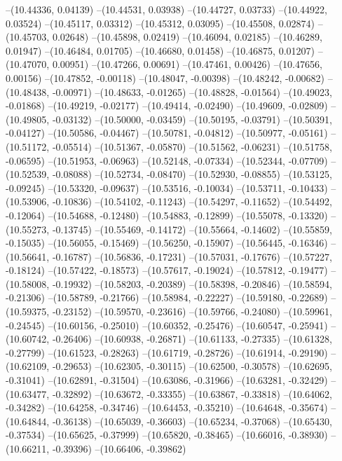 --(10.44336, 0.04139)
--(10.44531, 0.03938)
--(10.44727, 0.03733)
--(10.44922, 0.03524)
--(10.45117, 0.03312)
--(10.45312, 0.03095)
--(10.45508, 0.02874)
--(10.45703, 0.02648)
--(10.45898, 0.02419)
--(10.46094, 0.02185)
--(10.46289, 0.01947)
--(10.46484, 0.01705)
--(10.46680, 0.01458)
--(10.46875, 0.01207)
--(10.47070, 0.00951)
--(10.47266, 0.00691)
--(10.47461, 0.00426)
--(10.47656, 0.00156)
--(10.47852, -0.00118)
--(10.48047, -0.00398)
--(10.48242, -0.00682)
--(10.48438, -0.00971)
--(10.48633, -0.01265)
--(10.48828, -0.01564)
--(10.49023, -0.01868)
--(10.49219, -0.02177)
--(10.49414, -0.02490)
--(10.49609, -0.02809)
--(10.49805, -0.03132)
--(10.50000, -0.03459)
--(10.50195, -0.03791)
--(10.50391, -0.04127)
--(10.50586, -0.04467)
--(10.50781, -0.04812)
--(10.50977, -0.05161)
--(10.51172, -0.05514)
--(10.51367, -0.05870)
--(10.51562, -0.06231)
--(10.51758, -0.06595)
--(10.51953, -0.06963)
--(10.52148, -0.07334)
--(10.52344, -0.07709)
--(10.52539, -0.08088)
--(10.52734, -0.08470)
--(10.52930, -0.08855)
--(10.53125, -0.09245)
--(10.53320, -0.09637)
--(10.53516, -0.10034)
--(10.53711, -0.10433)
--(10.53906, -0.10836)
--(10.54102, -0.11243)
--(10.54297, -0.11652)
--(10.54492, -0.12064)
--(10.54688, -0.12480)
--(10.54883, -0.12899)
--(10.55078, -0.13320)
--(10.55273, -0.13745)
--(10.55469, -0.14172)
--(10.55664, -0.14602)
--(10.55859, -0.15035)
--(10.56055, -0.15469)
--(10.56250, -0.15907)
--(10.56445, -0.16346)
--(10.56641, -0.16787)
--(10.56836, -0.17231)
--(10.57031, -0.17676)
--(10.57227, -0.18124)
--(10.57422, -0.18573)
--(10.57617, -0.19024)
--(10.57812, -0.19477)
--(10.58008, -0.19932)
--(10.58203, -0.20389)
--(10.58398, -0.20846)
--(10.58594, -0.21306)
--(10.58789, -0.21766)
--(10.58984, -0.22227)
--(10.59180, -0.22689)
--(10.59375, -0.23152)
--(10.59570, -0.23616)
--(10.59766, -0.24080)
--(10.59961, -0.24545)
--(10.60156, -0.25010)
--(10.60352, -0.25476)
--(10.60547, -0.25941)
--(10.60742, -0.26406)
--(10.60938, -0.26871)
--(10.61133, -0.27335)
--(10.61328, -0.27799)
--(10.61523, -0.28263)
--(10.61719, -0.28726)
--(10.61914, -0.29190)
--(10.62109, -0.29653)
--(10.62305, -0.30115)
--(10.62500, -0.30578)
--(10.62695, -0.31041)
--(10.62891, -0.31504)
--(10.63086, -0.31966)
--(10.63281, -0.32429)
--(10.63477, -0.32892)
--(10.63672, -0.33355)
--(10.63867, -0.33818)
--(10.64062, -0.34282)
--(10.64258, -0.34746)
--(10.64453, -0.35210)
--(10.64648, -0.35674)
--(10.64844, -0.36138)
--(10.65039, -0.36603)
--(10.65234, -0.37068)
--(10.65430, -0.37534)
--(10.65625, -0.37999)
--(10.65820, -0.38465)
--(10.66016, -0.38930)
--(10.66211, -0.39396)
--(10.66406, -0.39862)
